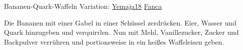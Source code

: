 \begin{recipe}[]{ Bananen-Quark-Waffeln }{Variation: \href{http://www.chefkoch.de/rezepte/1281851233570051/Bananenwaffeln.html}{Yemaja18} \href{http://www.chefkoch.de/rezepte/1066171211965130/Quark-Waffeln.html}{Fanca}}{  }



\step
Die Bananen mit einer Gabel in einer Schüssel zerdrücken. Eier, Wasser und Quark hinzugeben und verquirrlen.
\step
Nun mit Mehl, Vanillezucker, Zucker und Backpulver verrühren und portionsweise in ein heißes Waffeleisen geben.




\end{recipe}
